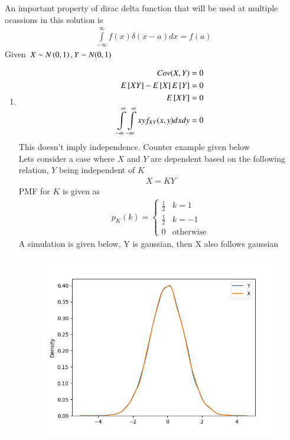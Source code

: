 

An important property of dirac delta function that will be used at multiple ocassions in this solution is
\begin{align}
\displaystyle\int\limits_{-\infty}^{\infty} f(x)\delta(x-a)dx=f(a) \label{dec/2015/109/eq:dirac}
\end{align}
Given $X\sim N\left(0,1\right), Y\sim N(0,1)$
\begin{enumerate}
\item
\begin{align}
Cov(X,Y)=0\\
E{}\left[XY\right]-E{}\left[X\right]E{}\left[Y\right]=0\\
E{}\left[XY\right]=0\\
\displaystyle \int\limits_{-\infty}^{\infty} \int\limits_{-\infty}^{\infty}xyf_{XY}(x,y) dxdy=0
\end{align}
This doesn't imply independence. Counter example given below\\
Lets consider a case where $X$ and $Y$ are dependent based on the following relation, $Y$ being independent of $K$
\begin{align}
X=KY \label{dec/2015/109/eq:case}
\end{align}
PMF for $K$ is given as
\begin{align}
p_K(k)=
\begin{cases}
\frac{1}{2} &k=1\\
\frac{1}{2} & k=-1\\
0 & \text{otherwise}
\end{cases}
\end{align}
A simulation is given below, Y is gaussian, then X also follows gaussian
\begin{figure}[!ht]
\centering
\includegraphics[width=\columnwidth]{solutions/2015/dec/109/figure/fig.png}

\end{figure}
\end{enumerate}
